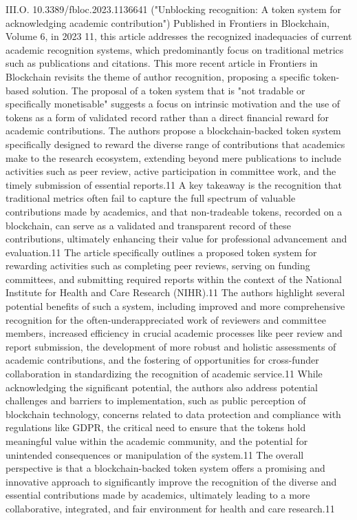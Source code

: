 \documentclass{article}
\begin{document}
III.O. 10.3389/fbloc.2023.1136641 ("Unblocking recognition: A token system for acknowledging academic contribution")
Published in Frontiers in Blockchain, Volume 6, in 2023 11, this article addresses the recognized inadequacies of current academic recognition systems, which predominantly focus on traditional metrics such as publications and citations. This more recent article in Frontiers in Blockchain revisits the theme of author recognition, proposing a specific token-based solution. The proposal of a token system that is "not tradable or specifically monetisable" suggests a focus on intrinsic motivation and the use of tokens as a form of validated record rather than a direct financial reward for academic contributions. The authors propose a blockchain-backed token system specifically designed to reward the diverse range of contributions that academics make to the research ecosystem, extending beyond mere publications to include activities such as peer review, active participation in committee work, and the timely submission of essential reports.11 A key takeaway is the recognition that traditional metrics often fail to capture the full spectrum of valuable contributions made by academics, and that non-tradeable tokens, recorded on a blockchain, can serve as a validated and transparent record of these contributions, ultimately enhancing their value for professional advancement and evaluation.11 The article specifically outlines a proposed token system for rewarding activities such as completing peer reviews, serving on funding committees, and submitting required reports within the context of the National Institute for Health and Care Research (NIHR).11 The authors highlight several potential benefits of such a system, including improved and more comprehensive recognition for the often-underappreciated work of reviewers and committee members, increased efficiency in crucial academic processes like peer review and report submission, the development of more robust and holistic assessments of academic contributions, and the fostering of opportunities for cross-funder collaboration in standardizing the recognition of academic service.11 While acknowledging the significant potential, the authors also address potential challenges and barriers to implementation, such as public perception of blockchain technology, concerns related to data protection and compliance with regulations like GDPR, the critical need to ensure that the tokens hold meaningful value within the academic community, and the potential for unintended consequences or manipulation of the system.11 The overall perspective is that a blockchain-backed token system offers a promising and innovative approach to significantly improve the recognition of the diverse and essential contributions made by academics, ultimately leading to a more collaborative, integrated, and fair environment for health and care research.11
\end{document}
